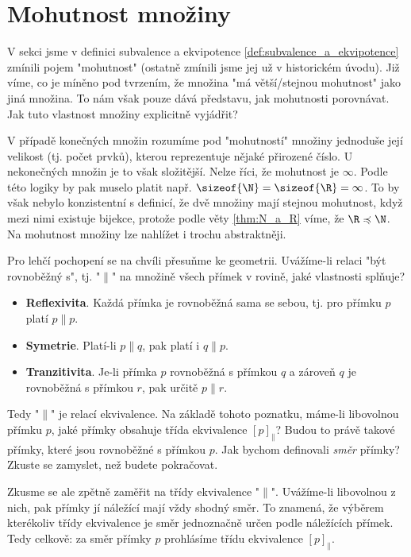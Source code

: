 \section{Mohutnost množiny}\label{sec:mohutnost_mnoziny}
V sekci jsme v definici subvalence a ekvipotence \ref{def:subvalence_a_ekvipotence} zmínili pojem "mohutnost" (ostatně zmínili jsme jej už v historickém úvodu). Již víme, co je míněno pod tvrzením, že množina "má větší/stejnou mohutnost" jako jiná množina. To nám však pouze dává představu, jak mohutnosti porovnávat. Jak tuto vlastnost množiny explicitně vyjádřit?\par
V případě konečných množin rozumíme pod "mohutností" množiny jednoduše její velikost (tj. počet prvků), kterou reprezentuje nějaké přirozené číslo. U nekonečných množin je to však složitější. Nelze říci, že mohutnost je $\infty$. Podle této logiky by pak muselo platit např. $\sizeof{\N}=\sizeof{\R}=\infty$. To by však nebylo konzistentní s definicí, že dvě množiny mají stejnou mohutnost, když mezi nimi existuje bijekce, protože podle věty \ref{thm:N_a_R} víme, že $\R\preccurlyeq\N$. Na mohutnost množiny lze nahlížet i trochu abstraktněji.
\medskip

Pro lehčí pochopení se na chvíli přesuňme ke geometrii. Uvážíme-li relaci "být rovnoběžný s", tj. "$\parallel$" na množině všech přímek v rovině, jaké vlastnosti splňuje?
\begin{itemize}
    \item \textbf{Reflexivita}. Každá přímka je rovnoběžná sama se sebou, tj. pro přímku $p$ platí $p\parallel p$.
    \item \textbf{Symetrie}. Platí-li $p\parallel q$, pak platí i $q\parallel p$.
    \item \textbf{Tranzitivita}. Je-li přímka $p$ rovnoběžná s přímkou $q$ a zároveň $q$ je rovnoběžná s přímkou $r$, pak určitě $p\parallel r$.
\end{itemize}
Tedy "$\parallel$" je relací ekvivalence. Na základě tohoto poznatku, máme-li libovolnou přímku $p$, jaké přímky obsahuje třída ekvivalence $[p]_\parallel$? Budou to právě takové přímky, které jsou rovnoběžné s přímkou $p$. Jak bychom definovali \emph{směr} přímky? Zkuste se zamyslet, než budete pokračovat.\par
Zkusme se ale zpětně zaměřit na třídy ekvivalence "$\parallel$". Uvážíme-li libovolnou z nich, pak přímky jí náležící mají vždy shodný směr. To znamená, že výběrem kterékoliv třídy ekvivalence je směr jednoznačně určen podle náležících přímek. Tedy celkově: za směr přímky $p$ prohlásíme třídu ekvivalence $[p]_\parallel$.
\medskip

